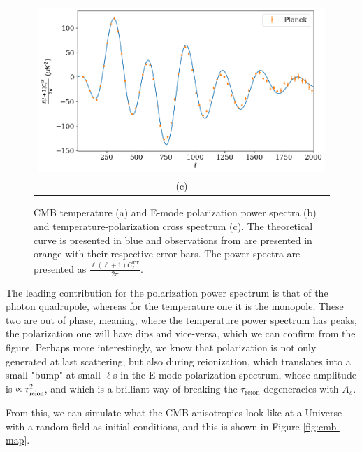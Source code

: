 \documentclass{aa}
\begin{document}
\begin{figure}
  \begin{tabular}{@{}c@{}}
    \includegraphics[width=\linewidth]{report/figures/power_spectrum_TE.png} \\[\abovecaptionskip]
    \small (c)
  \end{tabular}

  \caption{CMB temperature (a) and E-mode polarization power spectra (b) and temperature-polarization cross spectrum (c). The theoretical curve is presented in blue and observations from \cite{2020} are presented in orange with their respective error bars. The power spectra are presented as $\frac{\ell(\ell+1)C_\ell^\text{TT}}{2\pi}$.}\label{fig:power-spectra}
\end{figure}

The leading contribution for the polarization power spectrum is that of the photon quadrupole, whereas for the temperature one it is the monopole. These two are out of phase, meaning, where the temperature power spectrum has peaks, the polarization one will have dips and vice-versa, which we can confirm from the figure. Perhaps more interestingly, we know that polarization is not only generated at last scattering, but also during reionization, which translates into a small "bump" at small $\ell$s in the E-mode polarization spectrum, whose amplitude is $\propto \tau_{\rm reion}^2$, and which is a brilliant way of breaking the $\tau_\text{reion}$ degeneracies with $A_s$.

From this, we can simulate what the CMB anisotropies look like at a Universe with a random field as initial conditions, and this is shown in Figure \ref{fig:cmb-map}.
\end{document}
